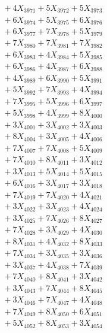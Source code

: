 \documentclass[a4paper,10pt]{article}
\begin{document}
{\begin{align}
&\;  + 4 X_{3971} + 5 X_{3972} + 5 X_{3973} \\[0.3ex]
&\;  + 6 X_{3974} + 5 X_{3975} + 6 X_{3976} \\[0.3ex]
&\;  + 6 X_{3977} + 7 X_{3978} + 5 X_{3979} \\[0.3ex]
&\;  + 7 X_{3980} + 7 X_{3981} + 7 X_{3982} \\[0.3ex]
&\;  + 6 X_{3983} + 4 X_{3984} + 5 X_{3985} \\[0.3ex]
&\;  + 6 X_{3986} + 4 X_{3987} + 6 X_{3988} \\[0.3ex]
&\;  + 4 X_{3989} + 6 X_{3990} + 5 X_{3991} \\[0.3ex]
&\;  + 5 X_{3992} + 7 X_{3993} + 4 X_{3994} \\[0.3ex]
&\;  + 7 X_{3995} + 5 X_{3996} + 6 X_{3997} \\[0.3ex]
&\;  + 5 X_{3998} + 4 X_{3999} + 8 X_{4000} \\[0.5ex]\allowbreak
&\;  + 3 X_{4001} + 3 X_{4002} + 3 X_{4003} \\[0.3ex]
&\;  + 8 X_{4004} + 3 X_{4005} + 4 X_{4006} \\[0.3ex]
&\;  + 7 X_{4007} + 7 X_{4008} + 5 X_{4009} \\[0.3ex]
&\;  + 7 X_{4010} + 8 X_{4011} + 3 X_{4012} \\[0.3ex]
&\;  + 3 X_{4013} + 5 X_{4014} + 5 X_{4015} \\[0.3ex]
&\;  + 6 X_{4016} + 3 X_{4017} + 3 X_{4018} \\[0.3ex]
&\;  + 7 X_{4019} + 7 X_{4020} + 4 X_{4021} \\[0.3ex]
&\;  + 3 X_{4022} + 3 X_{4023} + 4 X_{4024} \\[0.3ex]
&\;  + 3 X_{4025} + 7 X_{4026} + 8 X_{4027} \\[0.3ex]
&\;  + 7 X_{4028} + 3 X_{4029} + 4 X_{4030} \\[0.5ex]\allowbreak
&\;  + 8 X_{4031} + 4 X_{4032} + 8 X_{4033} \\[0.3ex]
&\;  + 7 X_{4034} + 3 X_{4035} + 3 X_{4036} \\[0.3ex]
&\;  + 3 X_{4037} + 4 X_{4038} + 7 X_{4039} \\[0.3ex]
&\;  + 7 X_{4040} + 8 X_{4041} + 3 X_{4042} \\[0.3ex]
&\;  + 3 X_{4043} + 7 X_{4044} + 8 X_{4045} \\[0.3ex]
&\;  + 3 X_{4046} + 7 X_{4047} + 4 X_{4048} \\[0.3ex]
&\;  + 7 X_{4049} + 8 X_{4050} + 6 X_{4051} \\[0.3ex]
&\;  + 5 X_{4052} + 8 X_{4053} + 3 X_{4054} \\[0.3ex]

\end{align}}
\end{document}
